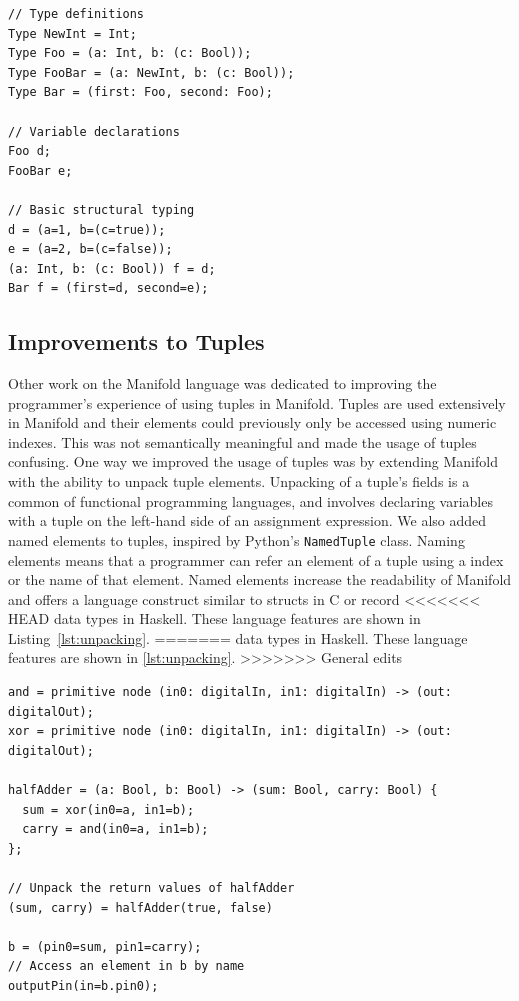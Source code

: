 \begin{lstlisting}[label=lst:types,caption=Example of types in a Manifold file]
// Type definitions
Type NewInt = Int;
Type Foo = (a: Int, b: (c: Bool));
Type FooBar = (a: NewInt, b: (c: Bool));
Type Bar = (first: Foo, second: Foo);

// Variable declarations
Foo d;
FooBar e;

// Basic structural typing
d = (a=1, b=(c=true));
e = (a=2, b=(c=false));
(a: Int, b: (c: Bool)) f = d;
Bar f = (first=d, second=e);
\end{lstlisting}


\subsection{Improvements to Tuples}

Other work on the Manifold language was dedicated to improving the programmer's experience of using
tuples in Manifold. Tuples are used extensively in Manifold and their
elements could previously only be accessed using numeric indexes. This was not
semantically meaningful and made the usage of tuples confusing. One way we improved the usage of tuples
was by extending
Manifold with the ability to unpack tuple elements. Unpacking of a tuple's
fields is a common of functional programming languages, and involves declaring
variables with a tuple on the left-hand side of an assignment expression. We
also added named elements to tuples, inspired by Python's \texttt{NamedTuple}
class. Naming elements means that a programmer can refer an element of a tuple using a
index or the name of that element. Named elements increase the readability of
Manifold and offers a language construct similar to structs in C or record
<<<<<<< HEAD
data types in Haskell. These language features are shown in Listing~\ref{lst:unpacking}.
=======
data types in Haskell. These language features are shown in \autoref{lst:unpacking}.
>>>>>>> General edits

\begin{lstlisting}[label=lst:unpacking, caption=Examples of new tuple features]
and = primitive node (in0: digitalIn, in1: digitalIn) -> (out: digitalOut);
xor = primitive node (in0: digitalIn, in1: digitalIn) -> (out: digitalOut);

halfAdder = (a: Bool, b: Bool) -> (sum: Bool, carry: Bool) {
  sum = xor(in0=a, in1=b);
  carry = and(in0=a, in1=b);
};

// Unpack the return values of halfAdder
(sum, carry) = halfAdder(true, false)

b = (pin0=sum, pin1=carry);
// Access an element in b by name
outputPin(in=b.pin0);
\end{lstlisting}

